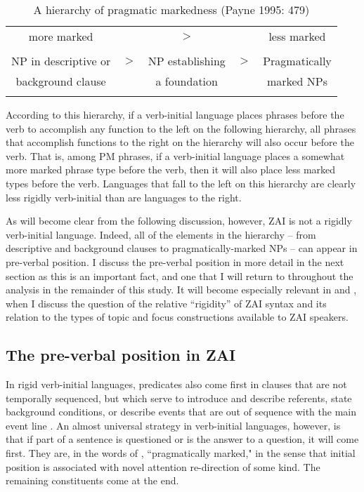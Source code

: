 \singlespacing
\begin{table}

\begin{tabular}{ c c c c c }
\midrule
more marked & & $>$ & & less marked \\
 & & &  & \\
NP in descriptive or &  $>$ & NP establishing & $>$ & Pragmatically  \\
background clause &  & a foundation &  &  marked NPs \\

\lspbottomrule
\end{tabular}\caption{{A hierarchy of pragmatic markedness (Payne 1995: 479)}}
\label{pragmaticmarkednesstable}

\end{table} 
According to this hierarchy, if a verb-initial language places phrases before the verb to accomplish any function to the left on the following hierarchy, all phrases that accomplish functions to the right on the hierarchy will also occur before the verb. That is, among PM phrases, if a verb-initial language places a somewhat more marked phrase type before the verb, then it will also place less marked types before the verb. Languages that fall to the left on this hierarchy are clearly less rigidly verb-initial than are languages to the right.

As will become clear from the following discussion, however, ZAI is not a rigidly verb-initial language. Indeed, all of the elements in the hierarchy -- from descriptive and background clauses to pragmatically-marked NPs -- can appear in pre-verbal position. I discuss the pre-verbal position in more detail in the next section as this is an important fact, and one that I will return to throughout the analysis in the remainder of this study. It will become especially relevant in  and , when I discuss the question of the relative ``rigidity'' of ZAI syntax and its relation to the types of topic and focus constructions available to ZAI speakers. 


\subsection{The pre-verbal position in ZAI}\label{pre-verbalpos}

In rigid verb-initial languages, predicates also come first in clauses that are not temporally sequenced, but which serve to introduce and describe referents, state background conditions, or describe events that are out of sequence with the main event line \citep[454]{payne1995}. An almost universal strategy in verb-initial languages, however, is that if part of a sentence is questioned or is the answer to a question, it will come first. They are, in the words of \citet{payne1995}, ``pragmatically marked," in the sense that initial position is associated with novel attention re-direction of some kind. The remaining constituents come at the end. 

